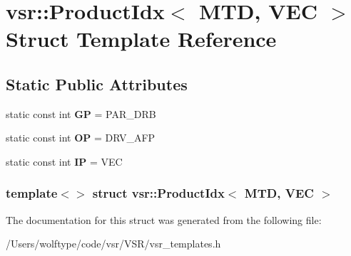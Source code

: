 \hypertarget{structvsr_1_1_product_idx_3_01_m_t_d_00_01_v_e_c_01_4}{\section{vsr\-:\-:Product\-Idx$<$ M\-T\-D, V\-E\-C $>$ Struct Template Reference}
\label{structvsr_1_1_product_idx_3_01_m_t_d_00_01_v_e_c_01_4}
}
\subsection*{Static Public Attributes}
\begin{DoxyCompactItemize}
\item 
\hypertarget{structvsr_1_1_product_idx_3_01_m_t_d_00_01_v_e_c_01_4_a5c3da027ea323d1bc50aebfb7c52d954}{static const int {\bfseries G\-P} = P\-A\-R\-\_\-\-D\-R\-B}\label{structvsr_1_1_product_idx_3_01_m_t_d_00_01_v_e_c_01_4_a5c3da027ea323d1bc50aebfb7c52d954}

\item 
\hypertarget{structvsr_1_1_product_idx_3_01_m_t_d_00_01_v_e_c_01_4_a64d076aea99290ca6805ac18773fb1a5}{static const int {\bfseries O\-P} = D\-R\-V\-\_\-\-A\-F\-P}\label{structvsr_1_1_product_idx_3_01_m_t_d_00_01_v_e_c_01_4_a64d076aea99290ca6805ac18773fb1a5}

\item 
\hypertarget{structvsr_1_1_product_idx_3_01_m_t_d_00_01_v_e_c_01_4_af7b5a85fe21126d3dfb348cce7ed8866}{static const int {\bfseries I\-P} = V\-E\-C}\label{structvsr_1_1_product_idx_3_01_m_t_d_00_01_v_e_c_01_4_af7b5a85fe21126d3dfb348cce7ed8866}

\end{DoxyCompactItemize}
\subsubsection*{template$<$$>$ struct vsr\-::\-Product\-Idx$<$ M\-T\-D, V\-E\-C $>$}



The documentation for this struct was generated from the following file\-:\begin{DoxyCompactItemize}
\item 
/\-Users/wolftype/code/vsr/\-V\-S\-R/vsr\-\_\-templates.\-h\end{DoxyCompactItemize}
